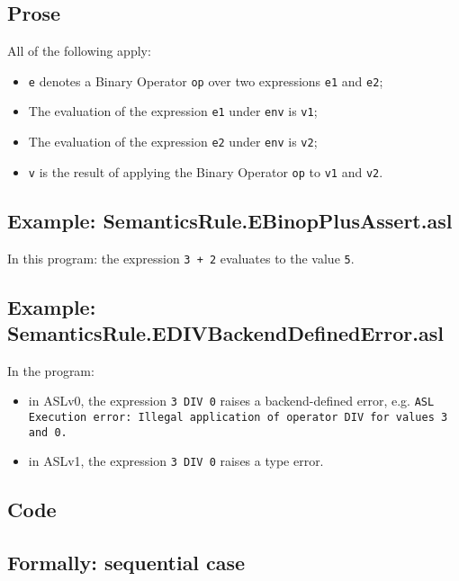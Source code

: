\documentclass{book}
\begin{document}
  \subsection{Prose}
  All of the following apply:
  \begin{itemize}
  \item \texttt{e} denotes a Binary Operator \texttt{op} over two expressions \texttt{e1} and \texttt{e2};
  \item The evaluation of the expression \texttt{e1} under \texttt{env} is \texttt{v1};
  \item The evaluation of the expression \texttt{e2} under \texttt{env} is \texttt{v2};
  \item \texttt{v} is the result of applying the Binary Operator \texttt{op} to \texttt{v1} and \texttt{v2}.
  \end{itemize}

  \subsection{Example: SemanticsRule.EBinopPlusAssert.asl}
    In this program:
    the expression \texttt{3 + 2} evaluates to the value \texttt{5}.

  \subsection{Example: SemanticsRule.EDIVBackendDefinedError.asl}
    In the program:
    \begin{itemize}
    \item in ASLv0, the expression \texttt{3 DIV 0} raises a backend-defined
      error, e.g.
      \texttt{ASL Execution error: Illegal application of operator DIV for values 3 and 0.}
    \item in ASLv1, the expression \texttt{3 DIV 0} raises a type error.
    \end{itemize}

  \subsection{Code}

  \subsection{Formally: sequential case}
  
\end{document}

